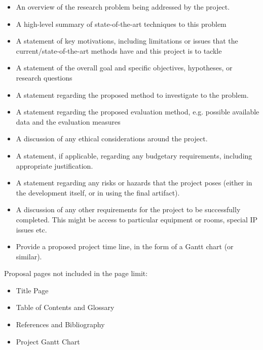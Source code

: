 \begin{itemize}
\item An overview of the research problem being addressed by the project.
\item A high-level summary of state-of-the-art techniques to this problem
\item A statement of key motivations, including limitations or issues that the current/state-of-the-art methods have and this project is to tackle
\item A statement of the overall goal and specific objectives, hypotheses, or research questions
\item A statement regarding the proposed method to investigate to the problem.
\item A statement regarding the proposed evaluation method, e.g. possible available data and the evaluation measures
\item A discussion of any ethical considerations around the project.
\item A statement, if applicable, regarding any budgetary requirements, including
  appropriate justification.
\item A statement regarding any risks or hazards that the project
  poses (either in the development itself, or in using the final
  artifact).
\item A discussion of any other requirements for the project to be successfully
completed. This might be access to particular equipment or rooms, special IP
issues etc.
\item Provide a proposed project time line, in the form of a Gantt
  chart (or similar).
\end{itemize}


{Proposal pages not included in the page limit:}
\begin{itemize}
	\item Title Page
	\item Table of Contents and Glossary
	\item References and Bibliography
	\item Project Gantt Chart
\end {itemize}

